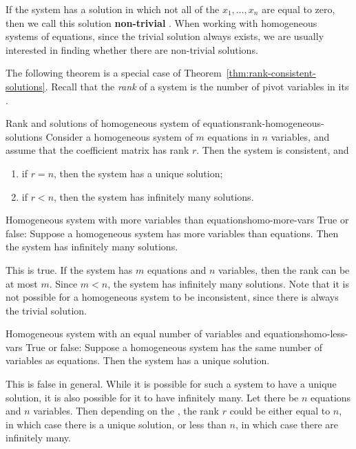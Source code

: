If the system has a solution in which not all of the
$x_1,\ldots, x_n$ are equal to zero, then we call this solution
\textbf{non-trivial}%
%
.  When
working with homogeneous systems of equations, since the trivial
solution always exists, we are usually interested in finding whether
there are non-trivial solutions.

The following theorem is a special case of
Theorem~\ref{thm:rank-consistent-solutions}. Recall that the
{\em rank}
of a system is the number of pivot variables in its {\ef}.

\begin{theorem}{Rank and solutions of homogeneous system of equations}{rank-homogeneous-solutions}
  Consider a homogeneous system of $m$ equations in $n$ variables, and
  assume that the coefficient matrix has rank $r$. Then the system is
  consistent, and 
\begin{enumerate}
\item if $r=n$, then the system has a unique solution;
\item if $r<n$, then the system has infinitely many solutions.
\end{enumerate}
\end{theorem}

\begin{example}{Homogeneous system with more variables than equations}{homo-more-vars}
  True or false: Suppose a homogeneous system has more variables than
  equations. Then the system has infinitely many solutions.  
\end{example}

\begin{solution}
  This is true. If the system has $m$ equations and $n$ variables,
  then the rank can be at most $m$. Since $m<n$, the system has
  infinitely many solutions. Note that it is not possible for a
  homogeneous system to be inconsistent, since there is always the
  trivial solution.
\end{solution} 

\begin{example}{Homogeneous system with an equal number of variables and equations}{homo-less-vars}
  True or false: Suppose a homogeneous system has the same number of
  variables as equations. Then the system has a unique solution.
\end{example}

\begin{solution}
  This is false in general. While it is possible for such a system to
  have a unique solution, it is also possible for it to have
  infinitely many. Let there be $n$ equations and $n$ variables.  Then
  depending on the {\ef}, the rank $r$ could be either equal to $n$,
  in which case there is a unique solution, or less than $n$, in which
  case there are infinitely many.
\end{solution}

